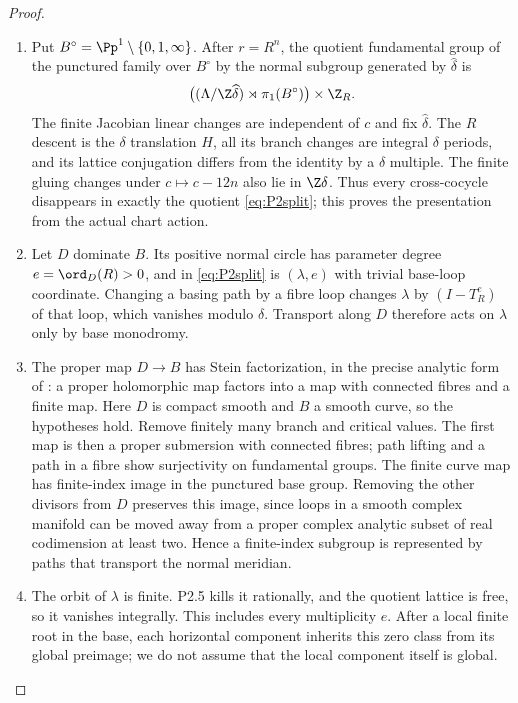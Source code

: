 \begin{proof}
\begin{enumerate}[label=\arabic*.,leftmargin=*]
\item Put $B^\circ=\Pp^1\setminus\{0,1,\infty\}$. After $r=R^n$, the quotient fundamental group of the punctured family over $B^\circ$ by the normal subgroup generated by $\widehat\delta$ is
\begin{equation}\label{eq:P2split}
 \bigl((\Lambda/\Z\widehat\delta)\rtimes\pi_1(B^\circ)\bigr)\times\Z_R.
\end{equation}
The finite Jacobian linear changes are independent of $c$ and fix $\widehat\delta$. The $R$ descent is the $\delta$ translation $H$, all its branch changes are integral $\delta$ periods, and its lattice conjugation differs from the identity by a $\delta$ multiple. The finite gluing changes under $c\mapsto c-12n$ also lie in $\Z\delta$. Thus every cross-cocycle disappears in exactly the quotient \eqref{eq:P2split}; this proves the presentation from the actual chart action.

\item Let $D$ dominate $B$. Its positive normal circle has parameter degree $e=\ord_D(R)>0$, and in \eqref{eq:P2split} is $(\lambda,e)$ with trivial base-loop coordinate. Changing a basing path by a fibre loop changes $\lambda$ by $(I-T_R^e)$ of that loop, which vanishes modulo $\delta$. Transport along $D$ therefore acts on $\lambda$ only by base monodromy.

\item The proper map $D\to B$ has Stein factorization, in the precise analytic form of \cite[Theorem 8.5]{Movasati24}: a proper holomorphic map factors into a map with connected fibres and a finite map. Here $D$ is compact smooth and $B$ a smooth curve, so the hypotheses hold. Remove finitely many branch and critical values. The first map is then a proper submersion with connected fibres; path lifting and a path in a fibre show surjectivity on fundamental groups. The finite curve map has finite-index image in the punctured base group. Removing the other divisors from $D$ preserves this image, since loops in a smooth complex manifold can be moved away from a proper complex analytic subset of real codimension at least two. Hence a finite-index subgroup is represented by paths that transport the normal meridian.

\item The orbit of $\lambda$ is finite. P2.5 kills it rationally, and the quotient lattice is free, so it vanishes integrally. This includes every multiplicity $e$. After a local finite root in the base, each horizontal component inherits this zero class from its global preimage; we do not assume that the local component itself is global.
\end{enumerate}
\end{proof}

